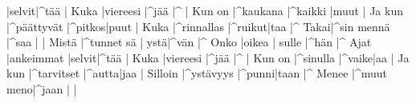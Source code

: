 |selvit|^tää | \e
    Kuka |viereesi |^jää |^ | \e
  \endverse\glueverses
  \beginverse[2]
    Kun on |^kaukana |^kaikki |muut | \e
    Ja kun |^päättyvät |^pitkos|puut | \e
    Kuka |^rinnallas |^ruikut|taa |^ \e
    Takai|^sin { } mennä |^saa | | \e
  \endverse
  \beginverse{}
    Mistä |^tunnet sä |{ } ystä|^vän |^ \e
    Onko |oikea |{ } sulle |^hän |^ \e
    Ajat |ankeimmat |selvit|^tää | \e
    Kuka |viereesi |^jää |^ | \e
  \endverse\glueverses
  \beginverse[2]
    Kun on |^sinulla |^vaike|aa | \e
    Ja kun |^tarvitset |^autta|jaa | \e
    Silloin |^ystävyys |^punni|taan |^ \e
    Menee |^muut { } meno|^jaan | | \e
  \endverse\glueverses
  \noteson
  \vspace{1ex}
  \beginverse[2]
\]\]\]\]\]\]\]\]\]\]\]\]\]\]\]\]\]\]\]\]\]\]\]\]\]\]\]\]\]\]\]\]\]\]\]\]\]\]\]\]\]\]\]\]\]\]\]\]\]\]\]\]\]\]\]\]\]\]\]\]\]\]\]\]\]\]\]\]\]\]\]\]\]\]\]\]\]\]\]\]\]\]\]\]\]\]\]\]\]\]\]\]\]\]\]\]\]\]\]\]\]\]\]\]\]\]\]\]\]\]\]\]\]\]\]\]\]\]\]\]\]\]\]\]\]\]\]\]\]\]\]\]\]\]\]\]\]\]\]\]\]\]\]\]\]\]\]\]\]\]\]\]\]\]\]\]\]\]\]\]\]\]\]\]\]\]\]\]\]\]\]\]\]\]\]\]\]\]\]\]\]\]\]\]\]\]\]\]\]\]\]\]\]\]\]\]\]\]\]\]\]\]\]\]\]\]\]\]\]\]\]\]\]\]\]\]\]\]\]\]\]\]\]\]\]\]\]\]\]\]\]\]\]\]\]\]\]\]\]\]\]\]\]\]\]\]\]\]\]\]\]\]\]\]\]\]\]\]\]\]\]\]\]\]\]\]\]\]\]\]\]\]\]\]\]\]\]\]\]\]\]\]\]\]\]\]\]\]\]\]\]\]\]\]\]\]\]\]\]\]\]\]\]\]\]\]\]\]\]\]\]\]\]\]\]\]\]\]\]\]\]\]\]\]\]\]\]\]\]\]\]\]\]\]\]\]\]\]\]\]\]\]\]\]\]\]\]\]\]\]\]\]\]\]\]\]\]\]\]\]\]\]\]\]\]\]\]\]\]\]\]\]\]\]\]\]\]\]\]\]\]\]\]\]\]\]\]\]\]\]\]\]\]\]\]\]\]\]\]\]\]\]\]\]\]\]\]\]\]\]\]\]\]\]\]\]\]\]\]\]\]\]\]\]\]\]\]\]\]\]\]\]\]\]\]\]\]\]\]\]\]\]\]\]\]\]\]\]\]\]\]\]\]\]\]\]\]\]\]\]\]\]\]\]\]\]\]\]\]\]\]\]\]\]\]\]\]\]\]\]\]\]\]\]\]\]\]\]\]\]\]\]\]\]\]\]\]\]\]\]\]\]\]\]\]\]\]\]\]\]\]\]\]\]\]\]\]\]\]\]\]\]\]\]\]\]\]\]\]\]\]\]\]\]\]\]\]\]\]\]\]\]\]\]\]\]\]\]\]\]\]\]\]\]\]\]\]\]\]\]\]\]\]\]\]\]\]\]\]\]\]\]\]\]\]\]\]\]\]\]\]\]\]\]\]\]\]\]\]\]\]\]\]\]\]\]\]\]\]\]\]\]\]\]\]\]\]\]\]\]\]\]\]\]\]\]\]\]\]\]\]\]\]\]\]\]\]\]\]\]\]\]\]\]\]\]\]\]\]\]\]\]\]\]\]\]\]\]\]\]\]\]\]\]\]\]\]\]\]\]\]\]\]\]\]\]\]\]\]\]\]\]\]\]\]\]\]\]\]\]\]\]\]\]\]\]\]\]\]\]\]\]\]\]\]\]\]\]\]\]\]\]\]\]\]\]\]\]\]\]\]\]\]\]\]\]\]\]\]\]\]\]\]\]\]\]\]\]\]\]\]\]\]\]\]\]\]\]\]\]\]\]\]\]\]\]\]\]\]\]\]\]\]\]\]\]\]\]\]\]\]\]\]\]\]\]\]\]\]\]\]\]\]\]\]\]\]\]\]\]\]\]\]\]\]\]\]\]\]\]\]\]\]\]\]\]\]\]\]\]\]\]\]\]\]\]\]\]\]\]\]\]\]\]\]\]\]\]\]\]\]\]\]\]\]\]\]\]\]\]\]\]\]\]\]\]\]\]\]\]\]\]\]\]\]\]\]\]\]\]\]\]\]\]\]\]\]\]\]\]\]\]\]\]\]\]\]\]\]\]\]\]\]\]\]\]\]\]\]\]\]\]\]\]\]\]\]\]\]\]\]\]\]\]\]\]\]\]\]\]\]\]\]\]\]\]\]\]\]\]\]\]\]\]\]\]\]\]\]\]\]\]\]\]\]\]\]\]\]\]\]\]\]\]\]\]\]\]\]\]\]\]\]\]\]\]\]\]\]\]\]\]\]\]\]\]\]\]\]\]\]\]\]\]\]\]\]\]\]\]\]\]\]\]\]\]\]\]\]\]\]\]\]\]\]\]\]\]\]\]\]\]\]\]\]\]\]\]\]\]\]\]\]\]\]\]\]\]\]\]\]\]\]\]\]\]\]\]\]\]\]\]\]\]\]\]\]\]\]\]\]\]\]\]\]\]\]\]\]\]\]\]\]\]\]\]\]\]\]\]\]\]\]\]\]\]\]\]\]\]\]\]\]\]\]\]\]\]\]\]\]\]\]\]\]\]\]\]\]\]\]\]\]\]\]\]\]\]\]\]\]\]\]\]\]\]\]\]\]\]\]\]\]\]\]\]\]\]\]\]\]\]\]\]\]\]\]\]\]\]\]\]\]\]\]\]\]\]\]\]\]\]\]\]\]\]\]\]\]\]\]\]\]\]\]\]\]\]\]\]\]\]\]\]\]\]\]\]\]\]\]\]\]\]\]\]\]\]\]\]\]\]\]\]\]\]\]\]\]\]\]\]\]\]\]\]\]\]\]\]\]\]\]\]\]\]\]\]\]\]\]\]\]\]\]\]\]
